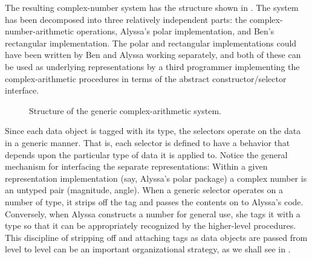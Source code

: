 The resulting complex-number system has the structure shown in .
The system has been decomposed into three relatively independent parts:
the complex-number-arithmetic operations, Alyssa’s polar implementation, and Ben’s rectangular implementation.
The polar and rectangular implementations could have been written by Ben and Alyssa working separately, and both of these can be used as underlying representations by a third programmer implementing the complex-arithmetic procedures in terms of the abstract constructor/selector interface.

\begin{figure}[tb]
	\centering
	
	\caption{
		Structure of the generic complex-arithmetic system.
	}
	\label{Figure 2.21}
\end{figure}

Since each data object is tagged with its type, the selectors operate on the data in a generic manner.
That is, each selector is defined to have a behavior that depends upon the particular type of data it is applied to.
Notice the general mechanism for interfacing the separate representations:
Within a given representation implementation (say, Alyssa’s polar package) a complex number is an untyped pair (magnitude, angle).
When a generic selector operates on a number of  type, it strips off the tag and passes the contents on to Alyssa’s code.
Conversely, when Alyssa constructs a number for general use, she tags it with a type so that it can be appropriately recognized by the higher-level procedures.
This discipline of stripping off and attaching tags as data objects are passed from level to level can be an important organizational strategy, as we shall see in .
